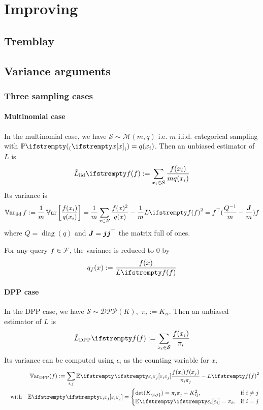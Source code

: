 \chapter{Improving}
\section{Tremblay}


\section{Variance arguments}
\subsection{Three sampling cases}
\subsubsection{Multinomial case}


In the multinomial case, we have $\mathcal S \sim \mathcal M(m, q)$ i.e. $m$ i.i.d. categorical sampling with $\PP(x_i) = q(x_i)$.
Then an unbiased estimator of $L$ is
\begin{equation*}
	\estloss{\textrm{iid}}{\query} := \sum_{x_i\in \mathcal S} \frac{\query(x_i)}{m q(x_i)}
\end{equation*}
Its variance is
\begin{equation}
	\Var_{\textrm{iid}}{\query} :=\frac{1}{m} \Var\left[\frac {\query(x_i)} {q(x_i)}\right] 
	=\frac{1}{m} \sum_{x \in \mathcal{X}} \frac{\query(x)^{2}}{q(x)} -\frac{1}{m} \loss{\query}^{2} = \query\T(\frac{Q^{-1}} m - \frac{\moones} m)\query
\end{equation}
where $Q = \operatorname{diag}(q)$ and $\boldsymbol{J} = \boldsymbol{j} \boldsymbol{j} ^\top$ the matrix full of ones. 

For any query $f \in \mathcal{F}$, the variance is reduced to 0 by
$$
q_{\query}(x):=\frac{ \query(x)}{\loss{\query}}
$$


\subsubsection{DPP case}
In the DPP case, we have $ \mathcal S \sim \mathcal{DPP}(K)$, \,$\pi_i := K_{ii}$. Then an unbiased estimator of $L$ is
\begin{equation*}
	\estloss{\textrm{DPP}}{\query} := \sum_{x_i\in \mathcal S} \frac{\query(x_i)}{\pi_i}
\end{equation*}
Its variance can be computed using $\epsilon_i$ as the counting variable for $x_i$
\begin{align*}
	\Var_{\textrm{DPP}}({\query})
:=\sum_{i, j}\EE{}{\epsilon_{i} \epsilon_{j}} \frac{\query(x_{i}) \query(x_{j})} {\pi_{i} \pi_{j}}  - \loss{\query}^{2}\\
\quad \text{with} \quad
\EE{}{\epsilon_{i} \epsilon_{j}}=
\begin{cases}
	\det(K_{\{i, j\}})=\pi_{i} \pi_{j}-K_{ij}^{2}, & \text{if } i \neq j \\
	\EE{}{\epsilon_{i}}=\pi_{i},&\text{if } i = j
\end{cases}
\end{align*}



